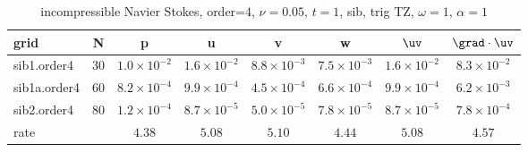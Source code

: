 \begin{table}[hbt]
\begin{center}
\begin{tabular}{|l|c|c|c|c|c|c|c|} \hline\hline 
grid  & N &  p &  u & v & w & $\uv$ & $\grad\cdot\uv$\\ \hline 
         sib1.order4 &    30 &  $1.0\times10^{ -2}$  &  $1.6\times10^{ -2}$  &  $8.8\times10^{ -3}$  &  $7.5\times10^{ -3}$  &  $1.6\times10^{ -2}$  &  $8.3\times10^{ -2}$   \\ \hline
        sib1a.order4 &    60 &  $8.2\times10^{ -4}$  &  $9.9\times10^{ -4}$  &  $4.5\times10^{ -4}$  &  $6.6\times10^{ -4}$  &  $9.9\times10^{ -4}$  &  $6.2\times10^{ -3}$   \\ \hline
         sib2.order4 &    80 &  $1.2\times10^{ -4}$  &  $8.7\times10^{ -5}$  &  $5.0\times10^{ -5}$  &  $7.8\times10^{ -5}$  &  $8.7\times10^{ -5}$  &  $7.8\times10^{ -4}$   \\ \hline
    rate            &     &       $4.38$ &       $5.08$ &       $5.10$ &       $4.44$ &       $5.08$ &       $4.57$  \\ \hline\hline
\end{tabular}
\caption{incompressible Navier Stokes, order=$4$, $\nu=0.05$, $t=1$, sib, trig TZ, $\omega=1$, $\alpha=1$}\label{table:ins.sib}
\end{center}
\end{table}

